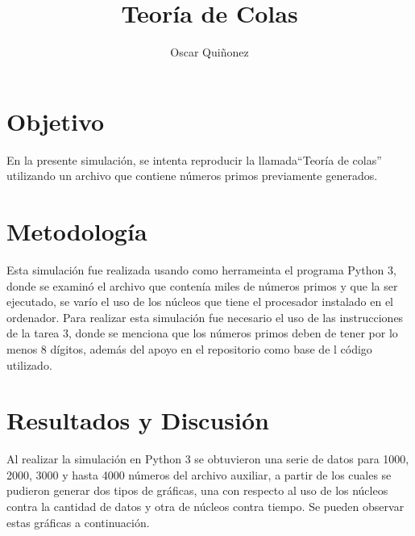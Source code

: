 \documentclass{article}
\title { Teor\'ia de Colas}
\author{Oscar Qui\~nonez}
\begin{document}
\maketitle
 
\section{Objetivo}\label{met}

En la presente simulaci\'on, se intenta reproducir la llamada``Teor\'ia de colas'' utilizando un archivo que contiene n\'umeros primos previamente generados.

\section{Metodolog\'ia}\label{met}

Esta simulaci\'on fue realizada usando como herrameinta el programa Python 3, donde se examin\'o el archivo que conten\'ia miles de n\'umeros primos y que la ser ejecutado, se var\'io el uso de los n\'ucleos que tiene el procesador instalado en el ordenador. Para realizar esta simulaci\'on fue necesario el uso de las instrucciones \cite{satuelisa} de la tarea 3, donde se menciona que los n\'umeros primos deben de tener por lo menos 8 d\'igitos, adem\'as del apoyo en el repositorio  \cite{baz} como base de l c\'odigo utilizado.

\section{Resultados y Discusi\'on}\label{res}

Al realizar la simulaci\'on en Python 3 se obtuvieron una serie de datos para 1000, 2000, 3000 y hasta 4000 n\'umeros del archivo auxiliar, a partir de los cuales se pudieron generar dos tipos de gr\'aficas, una con respecto al uso de los n\'ucleos contra la cantidad de datos y otra de n\'ucleos contra tiempo. Se pueden observar estas gr\'aficas a continuaci\'on.
\end{document}
